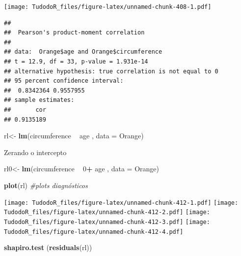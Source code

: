 \documentclass[
]{book}
\newenvironment{Shaded}{\begin{snugshade}}{\end{snugshade}}
\newcommand{\CommentTok}[1]{\textcolor[rgb]{0.56,0.35,0.01}{\textit{#1}}}
\newcommand{\DataTypeTok}[1]{\textcolor[rgb]{0.13,0.29,0.53}{#1}}
\newcommand{\DecValTok}[1]{\textcolor[rgb]{0.00,0.00,0.81}{#1}}
\newcommand{\KeywordTok}[1]{\textcolor[rgb]{0.13,0.29,0.53}{\textbf{#1}}}
\newcommand{\NormalTok}[1]{#1}
\newcommand{\OperatorTok}[1]{\textcolor[rgb]{0.81,0.36,0.00}{\textbf{#1}}}
\newcommand{\StringTok}[1]{\textcolor[rgb]{0.31,0.60,0.02}{#1}}
\begin{document}
\texttt{[image: TudodoR\_files/figure-latex/unnamed-chunk-408-1.pdf]}

\begin{Shaded}
\end{Shaded}

\begin{verbatim}
## 
##  Pearson's product-moment correlation
## 
## data:  Orange$age and Orange$circumference
## t = 12.9, df = 33, p-value = 1.931e-14
## alternative hypothesis: true correlation is not equal to 0
## 95 percent confidence interval:
##  0.8342364 0.9557955
## sample estimates:
##       cor 
## 0.9135189
\end{verbatim}

\begin{Shaded}
\begin{Highlighting}[]
\NormalTok{rl<-}\StringTok{ }\KeywordTok{lm}\NormalTok{(circumference }\OperatorTok{~}\StringTok{ }\NormalTok{age , }\DataTypeTok{data =}\NormalTok{ Orange)}
\end{Highlighting}
\end{Shaded}

Zerando o intercepto

\begin{Shaded}
\begin{Highlighting}[]
\NormalTok{rl0<-}\StringTok{ }\KeywordTok{lm}\NormalTok{(circumference }\OperatorTok{~}\StringTok{ }\DecValTok{0}\OperatorTok{+}\StringTok{ }\NormalTok{age , }\DataTypeTok{data =}\NormalTok{ Orange)}
\end{Highlighting}
\end{Shaded}

\begin{Shaded}
\begin{Highlighting}[]
\KeywordTok{plot}\NormalTok{(rl) }\CommentTok{#plots diagnósticos}
\end{Highlighting}
\end{Shaded}

\texttt{[image: TudodoR\_files/figure-latex/unnamed-chunk-412-1.pdf]} \texttt{[image: TudodoR\_files/figure-latex/unnamed-chunk-412-2.pdf]} \texttt{[image: TudodoR\_files/figure-latex/unnamed-chunk-412-3.pdf]} \texttt{[image: TudodoR\_files/figure-latex/unnamed-chunk-412-4.pdf]}

\begin{Shaded}
\begin{Highlighting}[]
\KeywordTok{shapiro.test}\NormalTok{ (}\KeywordTok{residuals}\NormalTok{(rl))}
\end{Highlighting}
\end{Shaded}
\end{document}
